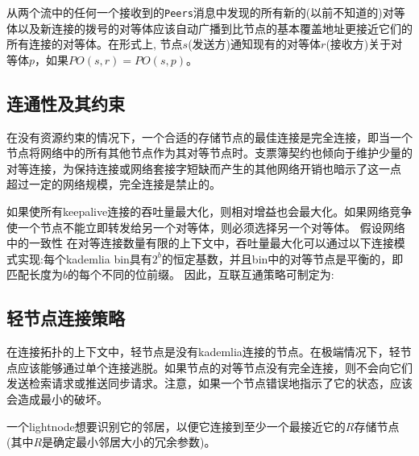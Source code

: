 
从两个流中的任何一个接收到的\lstinline{Peers}消息中发现的所有新的(以前不知道的)对等体以及新连接的拨号的对等体应该自动广播到比节点的基本覆盖地址更接近它们的所有连接的对等体。在形式上, 
节点$s$(发送方)通知现有的对等体$r$(接收方)关于对等体$p$，如果$\mathit{PO}(s, r) = \mathit{PO}(s, p)$。 

\subsection{连通性及其约束}

在没有资源约束的情况下，一个合适的存储节点的最佳连接是完全连接，即当一个节点将网络中的所有其他节点作为其对等节点时。支票簿契约也倾向于维护少量的对等连接，为保持连接或网络套接字短缺而产生的其他网络开销也暗示了这一点 
超过一定的网络规模，完全连接是禁止的。

如果使所有keepalive连接的吞吐量最大化，则相对增益也会最大化。如果网络竞争使一个节点不能立即转发给另一个对等体，则必须选择另一个对等体。 
假设网络中的一致性 
在对等连接数量有限的上下文中，吞吐量最大化可以通过以下连接模式实现:每个kademlia bin具有$2^b$的恒定基数，并且bin中的对等节点是平衡的，即匹配长度为$b$的每个不同的位前缀。
因此，互联互通策略可制定为:







\subsection{轻节点连接策略}

在连接拓扑的上下文中，轻节点是没有kademlia连接的节点。在极端情况下，轻节点应该能够通过单个连接逃脱。如果节点的对等节点没有完全连接，则不会向它们发送检索请求或推送同步请求。注意，如果一个节点错误地指示了它的状态，应该会造成最小的破坏。 

一个lightnode想要识别它的邻居，以便它连接到至少一个最接近它的$R$存储节点(其中$R$是确定最小邻居大小的冗余参数)。



